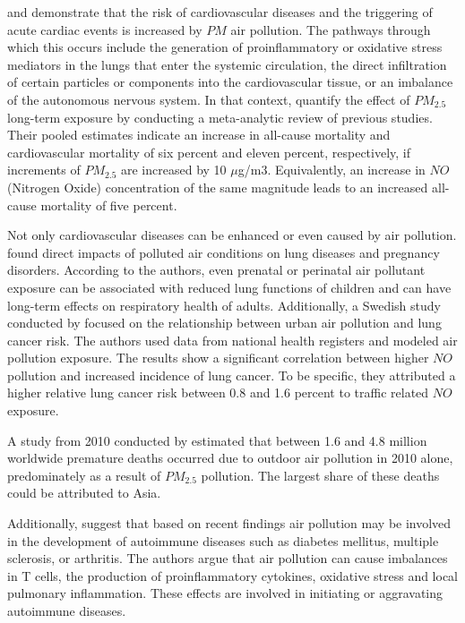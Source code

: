 \documentclass[
]{article}
\begin{document}
	\cite{franklin2015air} and \cite{fiordelisi2017mechanisms} demonstrate that the risk of cardiovascular diseases and the triggering of acute cardiac events is increased by $PM$ air pollution. The pathways through which this occurs include the generation of proinflammatory or oxidative stress mediators in the lungs that enter the systemic circulation, the direct infiltration of certain particles or components into the cardiovascular tissue, or an imbalance of the autonomous nervous system. In that context, \cite{hoek2013long} quantify the effect of $PM_{2.5}$ long-term exposure by conducting a meta-analytic review of previous studies. Their pooled estimates indicate an increase in all-cause mortality and cardiovascular mortality of six percent and eleven percent, respectively, if increments of $PM_{2.5}$ are increased by 10 $\mu$g/m3. Equivalently, an increase in $NO$ (Nitrogen Oxide) concentration of the same magnitude leads to an increased all-cause mortality of five percent.

	Not only cardiovascular diseases can be enhanced or even caused by air pollution. \cite{KIM2018} found direct impacts of polluted air conditions on lung diseases and pregnancy disorders. According to the authors, even prenatal or perinatal air pollutant exposure can be associated with reduced lung functions of children and can have long-term effects on respiratory health of adults. Additionally, a Swedish study conducted by \cite{NYBERG2000} focused on the relationship between urban air pollution and lung cancer risk. The authors used data from national health registers and modeled air pollution exposure. The results show a significant correlation between higher $NO$ pollution and increased incidence of lung cancer. To be specific, they attributed a higher relative lung cancer risk between 0.8 and 1.6 percent to traffic related $NO$ exposure.

	A study from 2010 conducted by \cite{LEL2015} estimated that between 1.6 and 4.8 million worldwide premature deaths occurred due to outdoor air pollution in 2010 alone, predominately as a result of $PM_{2.5}$ pollution. The largest share of these deaths could be attributed to Asia.

	Additionally, \cite{zhao2019emerging} suggest that based on recent findings air pollution may be involved in the development of autoimmune diseases such as diabetes mellitus, multiple sclerosis, or arthritis. The authors argue that air pollution can cause imbalances in T cells, the production of proinflammatory cytokines, oxidative stress and local pulmonary inflammation. These effects are involved in initiating or aggravating autoimmune diseases. \\
\end{document}
